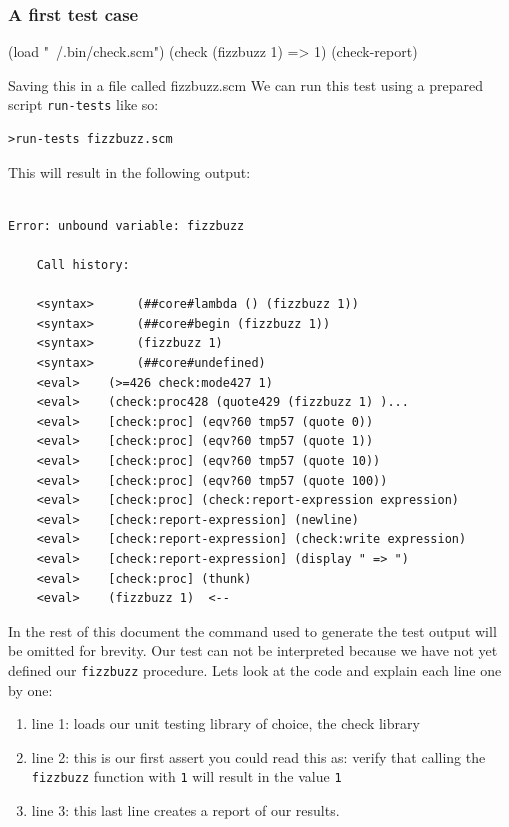 \documentclass[12pt,a4paper,english,twoside]{article}
\begin{document}
\subsubsection{A first test case}
\begin{schemecode}
(load "~/.bin/check.scm")
(check (fizzbuzz 1) => 1)
(check-report)
\end{schemecode}
Saving this in a file called fizzbuzz.scm We can run this test using a 
prepared script \texttt{run-tests} like so:
\begin{lstlisting}
>run-tests fizzbuzz.scm
\end{lstlisting}
This will result in the following output:
\begin{lstlisting}

Error: unbound variable: fizzbuzz

    Call history:

    <syntax>	  (##core#lambda () (fizzbuzz 1))
    <syntax>	  (##core#begin (fizzbuzz 1))
    <syntax>	  (fizzbuzz 1)
    <syntax>	  (##core#undefined)
    <eval>	  (>=426 check:mode427 1)
    <eval>	  (check:proc428 (quote429 (fizzbuzz 1) )...
    <eval>	  [check:proc] (eqv?60 tmp57 (quote 0))
    <eval>	  [check:proc] (eqv?60 tmp57 (quote 1))
    <eval>	  [check:proc] (eqv?60 tmp57 (quote 10))
    <eval>	  [check:proc] (eqv?60 tmp57 (quote 100))
    <eval>	  [check:proc] (check:report-expression expression)
    <eval>	  [check:report-expression] (newline)
    <eval>	  [check:report-expression] (check:write expression)
    <eval>	  [check:report-expression] (display " => ")
    <eval>	  [check:proc] (thunk)
    <eval>	  (fizzbuzz 1)	<--
\end{lstlisting}
In the rest of this document the command used to generate the test output will 
be omitted for brevity. Our test can not be interpreted because we have not yet defined our 
\texttt{fizzbuzz} procedure. Lets look at the code and explain each line 
one by one:

\begin{enumerate}
  \item line 1: loads our unit testing library of choice, the check library
  \item line 2: this is our first assert you could read this as: verify that calling 
    the \texttt{fizzbuzz} function with \texttt{1} will result in the value 
    \texttt{1}
 \item line 3: this last line creates a report of our results.
\end{enumerate}
\end{document}
